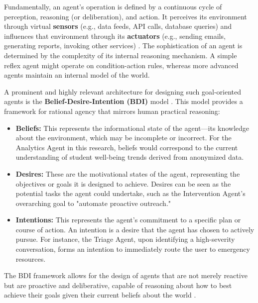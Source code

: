 Fundamentally, an agent's operation is defined by a continuous cycle of perception, reasoning (or deliberation), and action. It perceives its environment through virtual \textbf{sensors} (e.g., data feeds, API calls, database queries) and influences that environment through its \textbf{actuators} (e.g., sending emails, generating reports, invoking other services) \cite{FIND_CITATION_PLEASE}. The sophistication of an agent is determined by the complexity of its internal reasoning mechanism. A simple reflex agent might operate on condition-action rules, whereas more advanced agents maintain an internal model of the world.

A prominent and highly relevant architecture for designing such goal-oriented agents is the \textbf{Belief-Desire-Intention (BDI)} model \cite{FIND_CITATION_PLEASE}. This model provides a framework for rational agency that mirrors human practical reasoning:
\begin{itemize}
    \item \textbf{Beliefs:} This represents the informational state of the agent—its knowledge about the environment, which may be incomplete or incorrect. For the Analytics Agent in this research, beliefs would correspond to the current understanding of student well-being trends derived from anonymized data.
    \item \textbf{Desires:} These are the motivational states of the agent, representing the objectives or goals it is designed to achieve. Desires can be seen as the potential tasks the agent could undertake, such as the Intervention Agent's overarching goal to "automate proactive outreach."
    \item \textbf{Intentions:} This represents the agent's commitment to a specific plan or course of action. An intention is a desire that the agent has chosen to actively pursue. For instance, the Triage Agent, upon identifying a high-severity conversation, forms an intention to immediately route the user to emergency resources.
\end{itemize}
The BDI framework allows for the design of agents that are not merely reactive but are proactive and deliberative, capable of reasoning about how to best achieve their goals given their current beliefs about the world \cite{FIND_CITATION_PLEASE}.

